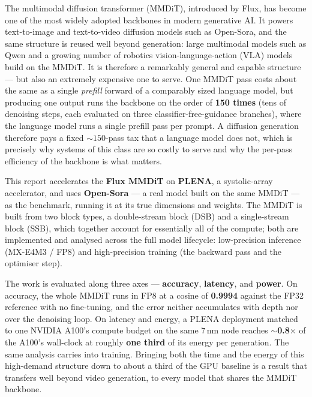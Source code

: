 \documentclass[11pt]{report}
\begin{document}
The multimodal diffusion transformer (MMDiT), introduced by Flux, has
become one of the most widely adopted backbones in modern generative AI.
It powers text-to-image and text-to-video diffusion models such as
Open-Sora, and the same structure is reused well beyond generation: large
multimodal models such as Qwen and a growing number of robotics
vision-language-action (VLA) models build on the MMDiT. It is therefore a
remarkably general and capable structure --- but also an extremely
expensive one to serve. One MMDiT pass costs about the same as a single
\emph{prefill} forward of a comparably sized language model, but producing
one output runs the backbone on the order of \textbf{150 times} (tens of
denoising steps, each evaluated on three classifier-free-guidance branches),
where the language model runs a single prefill pass per prompt. A diffusion
generation therefore pays a fixed ${\sim}150$-pass tax that a language model
does not, which is precisely why systems of this class are so costly to serve
and why the per-pass efficiency of the backbone is what matters.

This report accelerates the \textbf{Flux MMDiT} on \textbf{PLENA}, a
systolic-array accelerator, and uses \textbf{Open-Sora} --- a real model
built on the same MMDiT --- as the benchmark, running it at its true
dimensions and weights. The MMDiT is built from two block types, a
double-stream block (DSB) and a single-stream block (SSB), which together
account for essentially all of the compute; both are implemented and
analysed across the full model lifecycle: low-precision inference
(MX-E4M3 / FP8) and high-precision training (the backward pass and the
optimiser step).

The work is evaluated along three axes --- \textbf{accuracy},
\textbf{latency}, and \textbf{power}. On accuracy, the whole MMDiT runs in
FP8 at a cosine of \textbf{0.9994} against the FP32 reference with no
fine-tuning, and the error neither accumulates with depth nor over the
denoising loop. On latency and energy, a PLENA deployment matched to one
NVIDIA A100's compute budget on the same 7\,nm node reaches
\textbf{$\sim$0.8$\times$} of the A100's wall-clock at roughly
\textbf{one third} of its energy per generation. The same analysis carries
into training. Bringing both the time and the energy of this
high-demand structure down to about a third of the GPU baseline is a
result that transfers well beyond video generation, to every model that
shares the MMDiT backbone.

\end{document}

